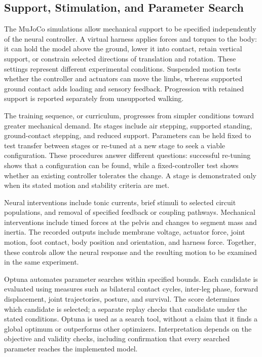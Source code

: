 \subsection{Support, Stimulation, and Parameter Search}\label{sec:sns_experiment_controls}

The MuJoCo simulations allow mechanical support to be specified independently of the neural controller. A virtual harness applies forces and torques to the body: it can hold the model above the ground, lower it into contact, retain vertical support, or constrain selected directions of translation and rotation. These settings represent different experimental conditions. Suspended motion tests whether the controller and actuators can move the limbs, whereas supported ground contact adds loading and sensory feedback. Progression with retained support is reported separately from unsupported walking.

The training sequence, or curriculum, progresses from simpler conditions toward greater mechanical demand. Its stages include air stepping, supported standing, ground-contact stepping, and reduced support. Parameters can be held fixed to test transfer between stages or re-tuned at a new stage to seek a viable configuration. These procedures answer different questions: successful re-tuning shows that a configuration can be found, while a fixed-controller test shows whether an existing controller tolerates the change. A stage is demonstrated only when its stated motion and stability criteria are met.

Neural interventions include tonic currents, brief stimuli to selected circuit populations, and removal of specified feedback or coupling pathways. Mechanical interventions include timed forces at the pelvis and changes to segment mass and inertia. The recorded outputs include membrane voltage, actuator force, joint motion, foot contact, body position and orientation, and harness force. Together, these controls allow the neural response and the resulting motion to be examined in the same experiment.

Optuna automates parameter searches within specified bounds. Each candidate is evaluated using measures such as bilateral contact cycles, inter-leg phase, forward displacement, joint trajectories, posture, and survival. The score determines which candidate is selected; a separate replay checks that candidate under the stated conditions. Optuna is used as a search tool, without a claim that it finds a global optimum or outperforms other optimizers. Interpretation depends on the objective and validity checks, including confirmation that every searched parameter reaches the implemented model.

